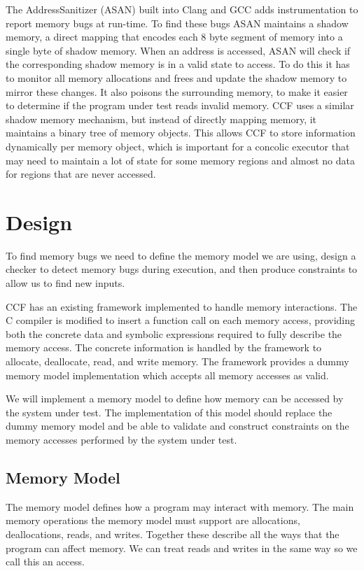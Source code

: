 \documentclass[12pt,twoside]{report}
\begin{document}
The AddressSanitizer \cite{180957} (ASAN) built into Clang and GCC adds instrumentation to report memory bugs at run-time. To find these bugs ASAN maintains a shadow memory, a direct mapping that encodes each 8 byte segment of memory into a single byte of shadow memory. When an address is accessed, ASAN will check if the corresponding shadow memory is in a valid state to access. To do this it has to monitor all memory allocations and frees and update the shadow memory to mirror these changes. It also poisons the surrounding memory, to make it easier to determine if the program under test reads invalid memory. CCF uses a similar shadow memory mechanism, but instead of directly mapping memory, it maintains a binary tree of memory objects. This allows CCF to store information dynamically per memory object, which is important for a concolic executor that may need to maintain a lot of state for some memory regions and almost no data for regions that are never accessed.

\chapter{Design}

To find memory bugs we need to define the memory model we are using, design a checker to detect memory bugs during execution, and then produce constraints to allow us to find new inputs.

CCF has an existing framework implemented to handle memory interactions. The C compiler is modified to insert a function call on each memory access, providing both the concrete data and symbolic expressions required to fully describe the memory access. The concrete information is handled by the framework to allocate, deallocate, read, and write memory. The framework provides a dummy memory model implementation which accepts all memory accesses as valid.

We will implement a memory model to define how memory can be accessed by the system under test. The implementation of this model should replace the dummy memory model and be able to validate and construct constraints on the memory accesses performed by the system under test.

\section{Memory Model}
The memory model defines how a program may interact with memory. The main memory operations the memory model must support are allocations, deallocations, reads, and writes. Together these describe all the ways that the program can affect memory. We can treat reads and writes in the same way so we call this an access.
\end{document}
